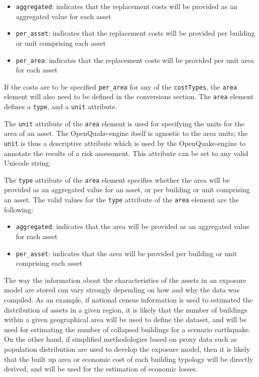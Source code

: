 \begin{itemize}

    \item \Verb+aggregated+: indicates that the replacement costs will be 
    provided as an aggregated value for each asset 

    \item \Verb+per_asset+: indicates that the replacement costs will be 
    provided per building or unit comprising each asset

    \item \Verb+per_area+: indicates that the replacement costs will be 
    provided per unit area for each asset

\end{itemize}

If the costs are to be specified \Verb+per_area+ for any of the
\Verb+costTypes+, the \Verb+area+ element will also need to be defined in the
conversions section. The \Verb+area+ element defines a \Verb+type+, and a
\Verb+unit+ attribute.

The \Verb+unit+ attribute of the \Verb+area+ element is used for specifying
the units for the area of an asset. The OpenQuake-engine itself is agnostic to the
area units; the \Verb+unit+ is thus a descriptive attribute which is used by the
OpenQuake-engine to annotate the results of a risk assessment. This attribute
can be set to any valid Unicode string.

The \Verb+type+ attribute of the \Verb+area+ element specifies whether the
area will be provided as an aggregated value for an asset, or per building or
unit comprising an asset. The valid values for the \Verb+type+ attribute of
the \Verb+area+ element are the following:

\begin{itemize}

    \item \Verb+aggregated+: indicates that the area will be provided as an 
    aggregated value for each asset

    \item \Verb+per_asset+: indicates that the area will be provided per 
    building or unit comprising each asset

\end{itemize}


The way the information about the characteristics of the \glspl{asset} in an
\gls{exposure model} are stored can vary strongly depending on how and why the
data was compiled. As an example, if national census information is used to
estimated the distribution of assets in a given region, it is likely that the
number of buildings within a given geographical area will be used to define
the dataset, and will be used for estimating the number of collapsed buildings
for a scenario earthquake. On the other hand, if simplified methodologies
based on proxy data such as population distribution are used to develop the
exposure model, then it is likely that the built up area or economic cost of
each building typology will be directly derived, and will be used for the
estimation of economic losses.


